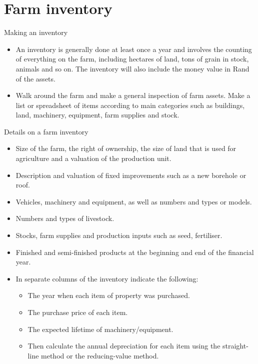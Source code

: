 \documentclass[12pt,ignorenonframetext,aspectratio=169]{beamer}
\providecommand{\tightlist}{%
  \setlength{\itemsep}{0pt}\setlength{\parskip}{0pt}}
\begin{document}
\hypertarget{farm-inventory}{%
\section{Farm inventory}\label{farm-inventory}}

\begin{frame}{Making an inventory}
\protect\hypertarget{making-an-inventory}{}
\begin{itemize}
\tightlist
\item
  An inventory is generally done at least once a year and involves the
  counting of everything on the farm, including hectares of land, tons
  of grain in stock, animals and so on. The inventory will also include
  the money value in Rand of the assets.
\item
  Walk around the farm and make a general inspection of farm assets.
  Make a list or spreadsheet of items according to main categories such
  as buildings, land, machinery, equipment, farm supplies and stock.
\end{itemize}
\end{frame}

\begin{frame}{Details on a farm inventory}
\protect\hypertarget{details-on-a-farm-inventory}{}
\begin{itemize}
\tightlist
\item
  Size of the farm, the right of ownership, the size of land that is
  used for agriculture and a valuation of the production unit.
\item
  Description and valuation of fixed improvements such as a new borehole
  or roof.
\item
  Vehicles, machinery and equipment, as well as numbers and types or
  models.
\item
  Numbers and types of livestock.
\item
  Stocks, farm supplies and production inputs such as seed, fertiliser.
\item
  Finished and semi-finished products at the beginning and end of the
  financial year.
\item
  In separate columns of the inventory indicate the following:

  \begin{itemize}
  \tightlist
  \item
    The year when each item of property was purchased.
  \item
    The purchase price of each item.
  \item
    The expected lifetime of machinery/equipment.
  \item
    Then calculate the annual depreciation for each item using the
    straight-line method or the reducing-value method.
  \end{itemize}
\end{itemize}
\end{frame}
\end{document}

